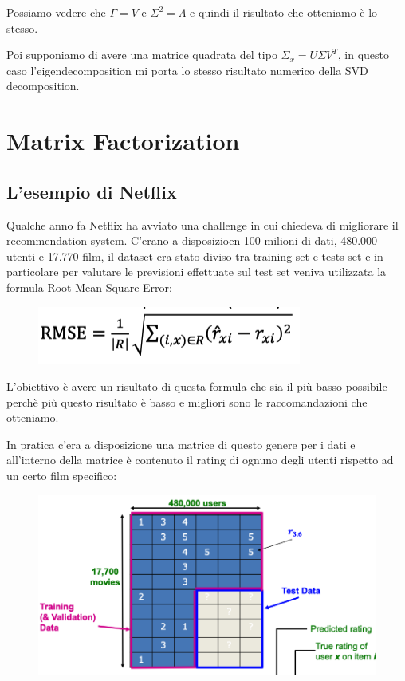 \documentclass[14pt]{extreport}
\begin{document}
Possiamo vedere che $\Gamma = V$ e $\Sigma^2 = \Lambda$ e quindi il risultato che otteniamo è lo stesso.


Poi supponiamo di avere una matrice quadrata del tipo $\Sigma_x = U \Sigma V^T$, in questo caso l'eigendecomposition mi porta lo stesso risultato numerico 
della SVD decomposition.



\section{Matrix Factorization}

\subsection{L'esempio di Netflix}

Qualche anno fa Netflix ha avviato una challenge in cui chiedeva di migliorare il recommendation system.
C'erano a disposizioen 100 milioni di dati, 480.000 utenti e 17.770 film, il dataset era stato diviso tra training set e tests set e in particolare per 
valutare le previsioni effettuate sul test set veniva utilizzata la formula Root Mean Square Error:


\begin{figure}[H] 
\centering
\includegraphics[width=0.7\linewidth]{511.jpeg}
\end{figure}

L'obiettivo è avere un risultato di questa formula che sia il più basso possibile perchè più questo risultato è basso e 
migliori sono le raccomandazioni che otteniamo.

In pratica c'era a disposizione una matrice di questo genere per i dati e all'interno della matrice è contenuto il rating di ognuno degli utenti
rispetto ad un certo film specifico:

\begin{figure}[H] 
\centering
\includegraphics[width=0.7\linewidth]{512.jpeg}
\end{figure}
\end{document}
